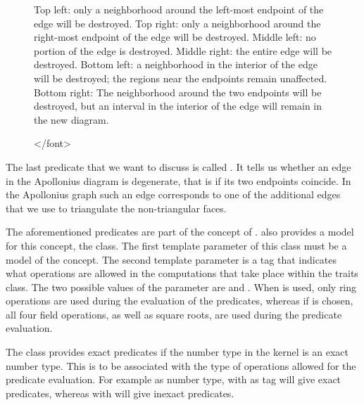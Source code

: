 \begin{figure}[!t]
{%
  Top left: only a neighborhood around
  the left-most endpoint of the edge will be destroyed. Top right:
  only a neighborhood around the right-most endpoint of the edge will
  be destroyed. Middle left: no portion of the edge is destroyed.
  Middle right: the entire edge will be destroyed. Bottom left: a
  neighborhood in the interior of the edge
  will be destroyed; the regions near the endpoints remain
  unaffected. Bottom right: The neighborhood around the two endpoints
  will be destroyed, but an interval in the interior of the edge will
  remain in the new diagram.}\label{fig-ag2edgeconflict}
\begin{ccHtmlOnly}
</font>
\end{ccHtmlOnly}
\end{figure}

The last predicate that we want to discuss is called
. It tells us whether an edge in the
Apollonius diagram is degenerate, that is if its two endpoints
coincide. In the Apollonius graph such an edge corresponds to one of
the additional edges that we use to triangulate the non-triangular
faces.

The aforementioned predicates are part of the
 concept of \cgal. \cgal{} also provides
a model for this concept, the
 class. The first
template parameter of this class must be a model of the 
concept. The second template parameter is a tag that indicates what
operations are allowed in the computations that take place within the
traits class.
The two possible values of the  parameter are
 and . When
 is used, only ring operations are used during the
evaluation of the predicates, whereas if  is
chosen, all four field operations, as well as square roots, are used
during the predicate evaluation.

The  class provides exact
predicates if the number type in the kernel  is an exact number
type. This is to be associated with the type of operations allowed for
the predicate evaluation. For example  as number
type, with  as tag will give exact predicates,
whereas  with  will give
inexact predicates.

